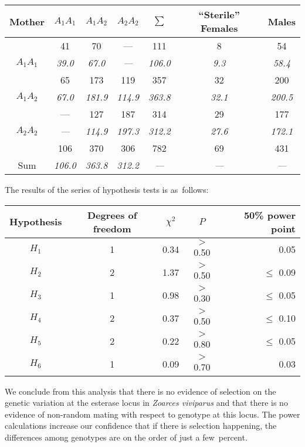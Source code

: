 \begin{center}
\begin{tabular}{c|ccc|c|cc}
Mother & $A_{1}A_{1}$ & $A_{1}A_{2}$ & $A_{2}A_{2}$ & $\sum$ & 
``Sterile'' Females & Males\\
\hline 
             & 41          & 70          & ---         & 111   
& 8          &  54\\
$A_{1}A_{1}$ & {\it 39.0}  & {\it 67.0}  & {\it ---}   & {\it 106.0} 
& {\it 9.3}  & {\it 58.4}\\
             & 65          & 173         & 119         & 357
& 32         & 200\\
$A_{1}A_{2}$ & {\it 67.0}  & {\it 181.9} & {\it 114.9} & {\it 363.8} 
& {\it 32.1} & {\it 200.5}\\
             & ---         & 127         & 187         & 314
& 29         & 177\\
$A_{2}A_{2}$ & {\it ---}   & {\it 114.9} & {\it 197.3} & {\it 312.2} 
& {\it 27.6} & {\it 172.1}\\
\hline 
             & 106         & 370         & 306         & 782
& 69         & 431\\
Sum          &  {\it 106.0} & {\it 363.8} & {\it 312.2} & {\it ---}
& {\it ---}  & {\it ---}\\
\end{tabular}
\end{center}

\noindent The results of the series of hypothesis tests is as~follows:

\begin{center}
\begin{tabular}{c|cc|c|r}
Hypothesis & Degrees of freedom & $\chi^2$ & $P$   & 50\% power point \\
\hline 
$H_1$      & 1                  & 0.34     & $>$0.50 & 0.05 \\
$H_2$      & 2                  & 1.37     & $>$0.50 & $\leq$ 0.09 \\
$H_3$      & 1                  & 0.98     & $>$0.30 & $\leq$ 0.05 \\
$H_4$      & 2                  & 0.37     & $>$0.50 & $\leq$ 0.10 \\
$H_5$      & 2                  & 0.22     & $>$0.80 & $\leq$ 0.05 \\
$H_6$      & 1                  & 0.09     & $>$0.70 & 0.03 \\
\end{tabular}
\end{center}

\medskip

We conclude from this analysis that there is no evidence of selection
on the genetic variation at the esterase locus in {\it Zoarces
viviparus\/} and that there is no evidence of non-random mating with
respect to genotype at this locus.  The power calculations increase
our confidence that if there is selection happening, the differences
among genotypes are on the order of just a few~percent.


